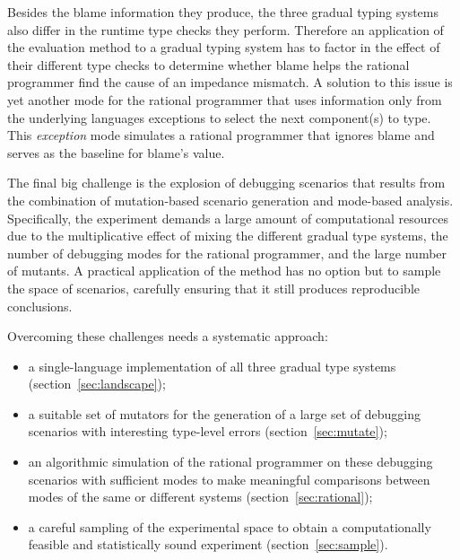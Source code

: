 
Besides the blame information they produce, the three gradual typing
systems also differ in the runtime type checks they perform. Therefore an
application of the evaluation method to a gradual typing system has to
factor in the effect of their different type checks to determine whether blame helps the
rational programmer find the cause of an impedance mismatch. A solution to this issue
is yet another mode for the rational programmer that uses information only
from the underlying languages exceptions to select the next component(s) to type.
This \emph{exception} mode simulates a rational programmer that ignores
blame and serves as the baseline for blame's value.

The final big challenge is the explosion of debugging scenarios that results from
the combination of mutation-based scenario generation and mode-based analysis.
Specifically, the experiment demands a large amount of computational resources
due to the multiplicative effect of mixing the different gradual type systems,
the number of debugging modes for the rational programmer, and the large number
of mutants.  A practical application of the method has no option but to sample
the space of scenarios, carefully ensuring that it still produces reproducible
conclusions.

\smallskip

Overcoming these challenges needs a systematic approach: 


\begin{itemize}

\item a single-language implementation of all three gradual type systems (section~\ref{sec:landscape});

\item a suitable set of mutators for the generation of a large set of debugging
  scenarios with interesting type-level errors (section~\ref{sec:mutate}); 
    
\item an algorithmic simulation of the rational programmer on these debugging
  scenarios with sufficient modes to make meaningful comparisons between modes of
  the same or different systems (section~\ref{sec:rational});

\item a careful sampling of the experimental space to obtain a computationally
  feasible and statistically sound experiment (section~\ref{sec:sample}).

\end{itemize}

